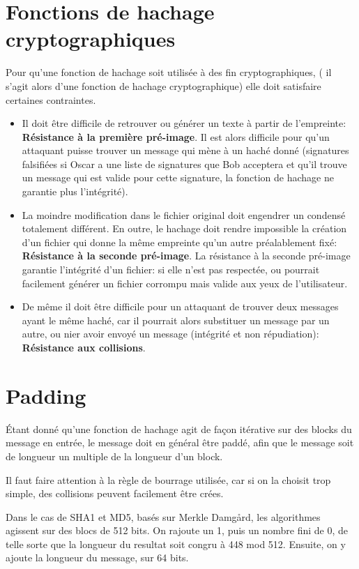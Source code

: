 \documentclass[10.5pt, a4paper, twoside, openright]{report}
\begin{document}
\section{Fonctions de hachage cryptographiques} 
Pour qu’une fonction de hachage soit utilisée à des fin cryptographiques, ( il s’agit alors d’une fonction de hachage cryptographique) elle doit satisfaire certaines contraintes.
\begin{itemize}
\item{Il doit être difficile de retrouver ou générer un texte à partir de l’empreinte: \textbf{Résistance à la première pré-image}.
Il est alors difficile pour qu’un attaquant puisse trouver un message qui mène à un haché donné 	(signatures falsifiées si Oscar a une liste de signatures que Bob acceptera et qu’il trouve un message qui est valide pour cette signature, la fonction de hachage ne garantie plus l’intégrité).}
\item{La moindre modification dans le fichier original doit engendrer un condensé totalement différent. En outre, le hachage doit rendre impossible la création d’un fichier qui donne la même empreinte qu’un autre préalablement fixé: \textbf{Résistance à la seconde pré-image}. 
La résistance à la seconde pré-image garantie l’intégrité d’un fichier: si elle n’est pas respectée, ou pourrait facilement générer un fichier corrompu mais valide aux yeux de l’utilisateur.}
\item{De même il doit être difficile pour un attaquant de trouver deux messages ayant le même haché, car il pourrait alors substituer un message par un autre, ou nier avoir envoyé un message (intégrité et non répudiation): \textbf{Résistance aux collisions}.}
\end{itemize}

\section{Padding}
Étant donné qu'une fonction de hachage agit de façon itérative sur des blocks du message en entrée, le message doit en général être paddé, afin que le message soit de longueur un multiple de la longueur d'un block.

Il faut faire attention à la règle de bourrage utilisée, car si on la choisit trop simple, des collisions peuvent facilement être crées.

Dans le cas de SHA1 et MD5, basés sur Merkle Damg\r{a}rd, les algorithmes agissent sur des blocs de 512 bits. On rajoute un 1, puis un nombre fini de 0, de telle sorte que la longueur du resultat soit congru à 448 mod 512. Ensuite, on y ajoute la longueur du message, sur 64 bits.
\end{document}
